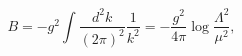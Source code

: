 \begin{equation}
B=-g^2\int\frac{d^2k}{(2\pi)^2}\frac{1}{k^2}=-\frac{g^2}{4\pi}\log\frac{\Lambda^2}{\mu^2},\label{anotherb}
\end{equation}

